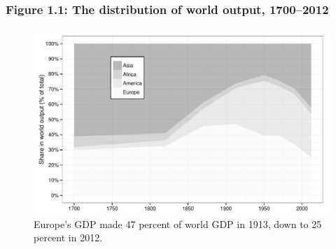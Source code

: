 \documentclass[t]{beamer}\usepackage[]{graphicx}\usepackage[]{color}
\newenvironment{knitrout}{}{} %
\begin{document}
\begin{frame}[label=Figure_1_1b]
\frametitle{Figure 1.1: The distribution of world output, 1700--2012}
\begin{figure}[t]
\begin{minipage}[b]{\textwidth}
\centering
\begin{knitrout}\footnotesize
{}\color{fgcolor}

{\centering \includegraphics[width=1\linewidth]{figures/bw/Figure_1_1b} 

}



\end{knitrout}
\caption{Europe's GDP made 47 percent of world GDP in 1913, down to 25 percent in 2012.}
\end{minipage}
\end{figure}
\end{frame}
\end{document}
